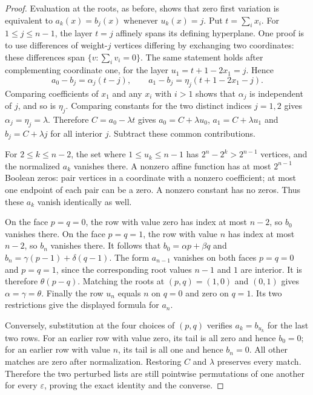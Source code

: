 \documentclass[11pt]{article}
\begin{document}
\begin{proof}
Evaluation at the roots, as before, shows that zero first variation is
equivalent to $a_k(x)=b_j(x)$ whenever $u_k(x)=j$.
Put $t=\sum_i x_i$. For $1\le j\le n-1$, the layer $t=j$ affinely
spans its defining hyperplane. One proof is to use differences of
weight-$j$ vertices differing by exchanging two coordinates: these
differences span $\{v:\sum_i v_i=0\}$.
The same statement holds after complementing coordinate one, for
the layer $u_1=t+1-2x_1=j$. Hence
\[
 a_0-b_j=\alpha_j(t-j),\qquad
 a_1-b_j=\eta_j(t+1-2x_1-j).
\]
Comparing coefficients of $x_1$ and any $x_i$ with $i>1$ shows that
$\alpha_j$ is independent of $j$, and so is $\eta_j$.
Comparing constants for the two distinct indices $j=1,2$ gives
$\alpha_j=\eta_j=\lambda$. Therefore
$C=a_0-\lambda t$ gives $a_0=C+\lambda u_0$,
$a_1=C+\lambda u_1$ and $b_j=C+\lambda j$ for all interior $j$.
Subtract these common contributions.

For $2\le k\le n-2$, the set where $1\le u_k\le n-1$ has
$2^n-2^k>2^{n-1}$ vertices, and the normalized $a_k$ vanishes there.
A nonzero affine function has at most $2^{n-1}$ Boolean zeros:
pair vertices in a coordinate with a nonzero coefficient; at most one
endpoint of each pair can be a zero. A nonzero constant has no zeros.
Thus these $a_k$ vanish identically as well.

On the face $p=q=0$, the row with value zero has index at most $n-2$,
so $b_0$ vanishes there. On the face $p=q=1$, the row with value $n$
has index at most $n-2$, so $b_n$ vanishes there. It follows that
$b_0=\alpha p+\beta q$ and
$b_n=\gamma(p-1)+\delta(q-1)$.
The form $a_{n-1}$ vanishes on both faces $p=q=0$ and $p=q=1$,
since the corresponding root values $n-1$ and $1$ are interior.
It is therefore $\theta(p-q)$. Matching the roots at $(p,q)=(1,0)$
and $(0,1)$ gives $\alpha=\gamma=\theta$.
Finally the row $u_n$ equals $n$ on $q=0$ and zero on $q=1$.
Its two restrictions give the displayed formula for $a_n$.

Conversely, substitution at the four choices of $(p,q)$ verifies
$a_k=b_{u_k}$ for the last two rows. For an earlier row with value
zero, its tail is all zero and hence $b_0=0$; for an earlier row with
value $n$, its tail is all one and hence $b_n=0$.
All other matches are zero after normalization. Restoring $C$ and
$\lambda$ preserves every match. Therefore the two perturbed lists
are still pointwise permutations of one another for every
$\varepsilon$, proving the exact identity and the converse.
\end{proof}
\end{document}
